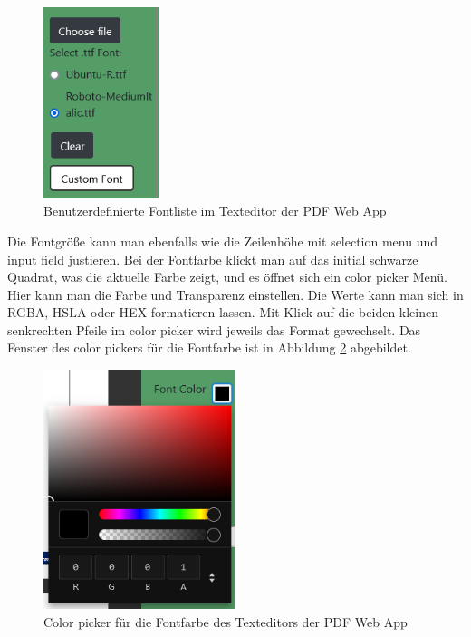 \begin{figure}[!htbp]
	\centering
	\includegraphics[width=0.3\textwidth]{"images/custom-font.png"}
	\caption{Benutzerdefinierte Fontliste im Texteditor der PDF Web App}
	\label{fig:custom-font}
\end{figure}

Die Fontgröße kann man ebenfalls wie die Zeilenhöhe mit selection menu und input field justieren. Bei der Fontfarbe klickt man auf das initial schwarze Quadrat, was die aktuelle Farbe zeigt, und es öffnet sich ein color picker Menü. Hier kann man die Farbe und Transparenz einstellen. Die Werte kann man sich in RGBA, HSLA oder HEX formatieren lassen. Mit Klick auf die beiden kleinen senkrechten Pfeile im color picker wird jeweils das Format gewechselt. Das Fenster des color pickers für die Fontfarbe ist in Abbildung \ref{fig:fontcolor} abgebildet. 

\begin{figure}[!htbp]
	\centering
	\includegraphics[width=0.5\textwidth]{"images/fontcolor.png"}
	\caption{Color picker für die Fontfarbe des Texteditors der PDF Web App}
	\label{fig:fontcolor}
\end{figure}

